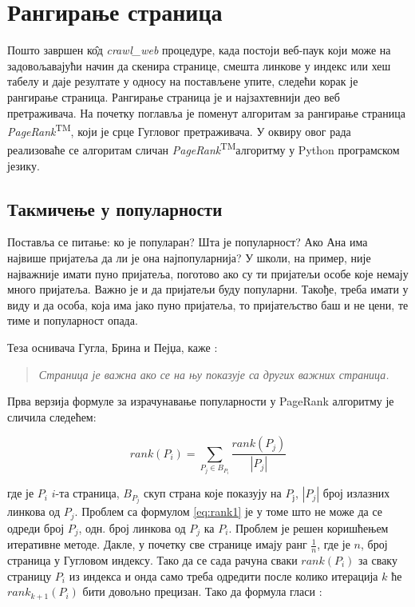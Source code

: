 \section{Рангирање страница}

Пошто завршен к\^{о}д \emph{crawl\_web} процедуре, када постоји веб-паук који може на задовољавајући начин да скенира странице, смешта линкове у индекс или хеш табелу и даје резултате у односу на постављене упите, следећи корак је рангирање страница. Рангирање страница је и најзахтевнији део веб претраживача. На почетку поглавља је поменут алгоритам за рангирање страница \emph{PageRank}\textsuperscript{TM}, који је срце Гугловог претраживача. У оквиру овог рада реализоваће се алгоритам сличан \emph{PageRank}\textsuperscript{TM}алгоритму у Python програмском језику.

\subsection{Такмичење у популарности}

Поставља се питање: ко је популаран? Шта је
популарност? Ако Ана има
највише пријатеља да ли је она најпопуларнија? У школи, на пример, није
најважније имати пуно пријатеља, поготово ако су ти пријатељи особе које немају
много пријатеља. Важно је и да пријатељи буду популарни. Такође, треба имати у
виду и да особа, која има јако пуно пријатеља, то пријатељство баш и не цени, те тиме и популарност опада.

Теза оснивача Гугла, Брина и Пејџа, каже \cite[Ch 4]{langville2011google}:

\begin{quote}
\textit{Страница је важна ако се на њу показује са других важних страница.}
\end{quote}

Прва верзија формуле за израчунавање популарности у PageRank алгоритму је сличила следећем:

\begin{equation}\label{eq:rank1}
rank(P_{i})=\sum_{P_{j}\in B_{P_{i}}}\frac{rank(P_{j})}{\left |P_{j}  \right |}
\end{equation}

где је $P_{i}$ $i$-та страница, $B_{P_{j}}$ скуп страна које показују на $P_{ј}$, $\left |P_{j}  \right |$ број излазних линкова од $P_{j}$. Проблем са формулом \ref{eq:rank1} је у томе што не може да се одреди број $P_{j}$, одн. број линкова од $P_{j}$ ка $P_{i}$. Проблем је решен коришћењем итеративне методе. Дакле, у почетку све странице имају ранг $\frac{1}{n}$, где је $n$, број страница у Гугловом индексу. Тако да се сада рачуна сваки $rank(P_{i})$ за сваку страницу $P_{i}$ из индекса и онда само треба одредити после колико итерација $k$ ће $rank_{k+1}(P_{i})$ бити довољно прецизан. Тако да формула гласи \cite[Ch 4.1]{langville2011google}:


